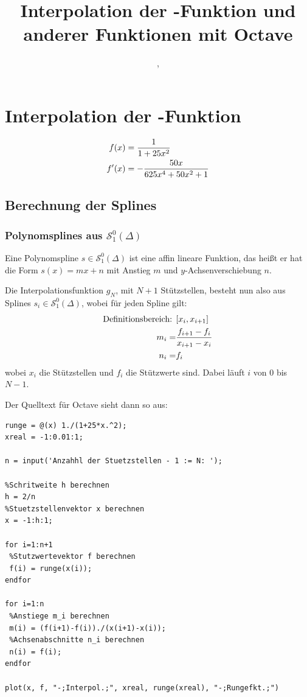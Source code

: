 \documentclass[ngerman,a4paper]{texmf/tex/latex/mathscript/mathscript}
\title{\textbf{Interpolation der \person{Runge}-Funktion und anderer Funktionen mit Octave}}
\author{\person{Henry Haustein}, \person{Lars Ortscheidt}}
\begin{document}
\maketitle
	
\tableofcontents
\pagebreak
	
\section{Interpolation der -Funktion}	
	\begin{align}
		f(x) &= \frac{1}{1+25x^2}\notag \\
		f' (x) &= -\frac{50x}{625x^4+50x^2+1}\notag
	\end{align}
	
	\subsection{Berechnung der Splines}
	\subsubsection{Polynomsplines aus $\mathcal{S}_1^0(\Delta)$}
	
	Eine Polynomspline $s\in\mathcal{S}_1^0(\Delta)$ ist eine affin lineare Funktion, das heißt er hat die Form $s(x)=mx+n$ mit Anstieg $m$ und $y$-Achsenverschiebung $n$. 
	
	Die Interpolationsfunktion $g_N$, mit $N+1$ Stützstellen, besteht nun also aus Splines $s_i\in\mathcal{S}_1^0(\Delta)$, wobei für jeden Spline gilt:
	\begin{align}
		\text{Definitionsbereich: } & [x_i,x_{i+1}] \notag \\
		m_i =& \frac{f_{i+1}-f_i}{x_{i+1}-x_i}\notag \\
		n_i =& f_i \notag
	\end{align} 
	wobei $x_i$ die Stützstellen und $f_i$ die Stützwerte sind. Dabei läuft $i$ von $0$ bis $N-1$.
	
	Der Quelltext für Octave sieht dann so aus:
\begin{lstlisting}
runge = @(x) 1./(1+25*x.^2);
xreal = -1:0.01:1;

n = input('Anzahhl der Stuetzstellen - 1 := N: ');

%Schritweite h berechnen
h = 2/n
%Stuetzstellenvektor x berechnen
x = -1:h:1;

for i=1:n+1
 %Stutzwertevektor f berechnen
 f(i) = runge(x(i));
endfor

for i=1:n
 %Anstiege m_i berechnen
 m(i) = (f(i+1)-f(i))./(x(i+1)-x(i));
 %Achsenabschnitte n_i berechnen
 n(i) = f(i);
endfor

plot(x, f, "-;Interpol.;", xreal, runge(xreal), "-;Rungefkt.;")
\end{lstlisting}
\end{document}
